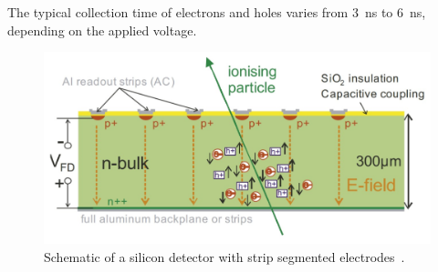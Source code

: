 The typical collection time of electrons and holes varies from 3~ns to 6~ns, depending on the applied voltage.
\begin{figure}[H]
	\centering
	\includegraphics[width=0.7\linewidth]{IMG/ch1/Detector.PNG}
	\caption{Schematic of a silicon detector with strip segmented electrodes~\cite{detector}.}
	\label{fig:detector}
\end{figure}
